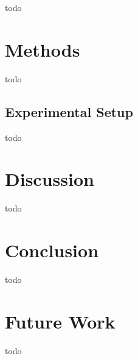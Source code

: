 \documentclass[conference]{IEEEtran}
\begin{document}
todo


\section{Methods}\label{sec:method}

todo


\subsection{Experimental Setup}\label{sec:setup}

todo


\section{Discussion}\label{sec:disc}

todo


\section{Conclusion}\label{sec:conc}

todo


\section{Future Work}\label{sec:futwork}

todo


\printbibliography
\end{document}
